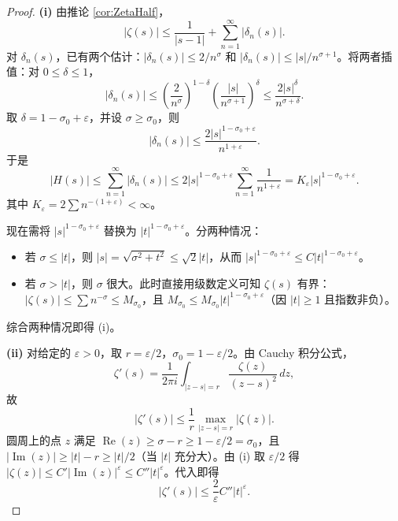 \documentclass[UTF8]{ctexart}
\numberwithin{equation}{section}
\begin{document}
\begin{proof}
\textbf{(i)} 由推论 \ref{cor:ZetaHalf}，
\[
|\zeta(s)| \le \frac{1}{|s-1|} + \sum_{n=1}^{\infty} |\delta_n(s)|.
\]
对 $\delta_n(s)$，已有两个估计：$|\delta_n(s)|\le 2/n^{\sigma}$ 和 $|\delta_n(s)|\le |s|/n^{\sigma+1}$。将两者插值：对 $0\le\delta\le1$，
\[
|\delta_n(s)| \le \left(\frac{2}{n^{\sigma}}\right)^{1-\delta}
\left(\frac{|s|}{n^{\sigma+1}}\right)^{\delta}
\le \frac{2|s|^{\delta}}{n^{\sigma+\delta}}.
\]
取 $\delta = 1-\sigma_0+\varepsilon$，并设 $\sigma\ge\sigma_0$，则
\[
|\delta_n(s)| \le \frac{2|s|^{1-\sigma_0+\varepsilon}}{n^{1+\varepsilon}}.
\]
于是
\[
|H(s)| \le \sum_{n=1}^{\infty} |\delta_n(s)|
\le 2|s|^{1-\sigma_0+\varepsilon} \sum_{n=1}^{\infty} \frac{1}{n^{1+\varepsilon}}
= K_\varepsilon |s|^{1-\sigma_0+\varepsilon}.
\]
其中 $K_\varepsilon = 2\sum n^{-(1+\varepsilon)}<\infty$。

现在需将 $|s|^{1-\sigma_0+\varepsilon}$ 替换为 $|t|^{1-\sigma_0+\varepsilon}$。分两种情况：
\begin{itemize}
\item 若 $\sigma \le |t|$，则 $|s| = \sqrt{\sigma^2+t^2} \le \sqrt{2}|t|$，从而 $|s|^{1-\sigma_0+\varepsilon} \le C |t|^{1-\sigma_0+\varepsilon}$。
\item 若 $\sigma > |t|$，则 $\sigma$ 很大。此时直接用级数定义可知 $\zeta(s)$ 有界：$|\zeta(s)| \le \sum n^{-\sigma} \le M_{\sigma_0}$，且 $M_{\sigma_0} \le M_{\sigma_0} |t|^{1-\sigma_0+\varepsilon}$（因 $|t|\ge1$ 且指数非负）。
\end{itemize}
综合两种情况即得 (i)。

\textbf{(ii)} 对给定的 $\varepsilon>0$，取 $r = \varepsilon/2$，$\sigma_0 = 1-\varepsilon/2$。由 Cauchy 积分公式，
\[
\zeta'(s) = \frac{1}{2\pi i} \int_{|z-s|=r} \frac{\zeta(z)}{(z-s)^2}\, dz,
\]
故
\[
|\zeta'(s)| \le \frac{1}{r} \max_{|z-s|=r} |\zeta(z)|.
\]
圆周上的点 $z$ 满足 $\operatorname{Re}(z) \ge \sigma - r \ge 1 - \varepsilon/2 = \sigma_0$，且 $|\operatorname{Im}(z)| \ge |t| - r \ge |t|/2$（当 $|t|$ 充分大）。由 (i) 取 $\varepsilon/2$ 得 $|\zeta(z)| \le C' |\operatorname{Im}(z)|^{\varepsilon} \le C'' |t|^{\varepsilon}$。代入即得
\[
|\zeta'(s)| \le \frac{2}{\varepsilon} C'' |t|^{\varepsilon}.
\]
\end{proof}
\end{document}
